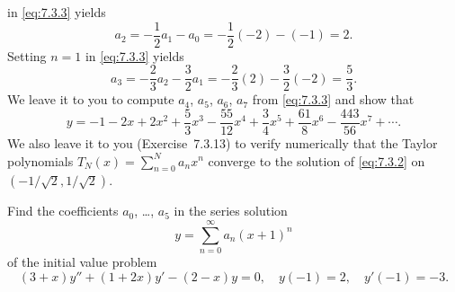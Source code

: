 \begin{examplesolution}
in \eqref{eq:7.3.3} yields
\[
  a_{2}=-\frac{1}{2}a_{1}-a_{0}=-\frac{1}{2}(-2)-(-1)=2.
\]
Setting $n=1$ in \eqref{eq:7.3.3} yields
\[
  a_{3}=-\frac{2}{3}a_{2}-\frac{3}{2}a_{1}=-\frac{2}{3}(2)-\frac{3}{2}(-2)=\frac{5}{3}.
\]
We leave it to you to compute $a_{4}$, $a_{5}$, $a_{6}$, $a_{7}$ from \eqref{eq:7.3.3} and show that
\[
  y=-1-2x+2x^{2}+\frac{5}{3}x^{3}-\frac{55}{12}x^{4}+\frac{3}{4}x^{5}+\frac{61}{8}x^{6}- \frac{443}{56}x^{7}+\cdots.
\]
We also leave it to you (Exercise~7.3.13) to verify numerically that the Taylor
polynomials $T_{N}(x)=\sum_{n=0}^{N}a_{n}x^{n}$ converge to the solution of \eqref{eq:7.3.2} on
$(-1/\sqrt{2},1/\sqrt{2})$.
\end{examplesolution}

\setcounter{example}{1}
\setcounter{equation}{3}
\begin{example}
  \label{example:7.3.2} \rm Find the coefficients $a_{0}$, \dots, $a_{5}$ in the series solution
  \[
    y=\sum^{\infty}_{n=0}a_{n}(x+1)^{n}
  \]
  of the initial value problem
  \begin{equation}
    \label{eq:7.3.4}(3+x)y''+(1+2x)y'-(2-x)y=0,\quad y(-1)=2,\quad y'(-1)=-3.
  \end{equation}
\end{example}
\setcounter{equation}{4}
